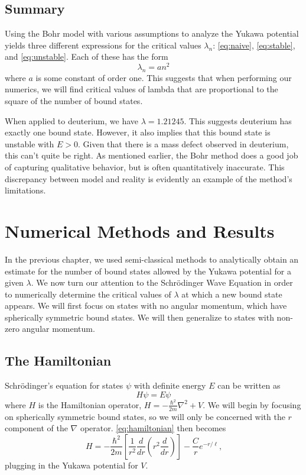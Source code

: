 \documentclass[12pt,twoside]{reedthesis}
\newcommand{\eqn}[1]{\begin{equation}#1\end{equation}}
\begin{document}
\section{Summary}
Using the Bohr model with various assumptions to analyze the Yukawa potential yields three different expressions for the critical values $\lambda_n$: \eqref{eq:naive}, \eqref{eq:stable}, and \eqref{eq:unstable}. Each of these has the form 
\eqn{
\lambda_{n} = a n^2
}
where $a$ is some constant of order one. This suggests that when performing our numerics, we will find critical values of lambda that are proportional to the square of the number of bound states. 

When applied to deuterium, we have $\lambda = 1.21245$. This suggests deuterium has exactly one bound state. However, it also implies that this bound state is unstable with $E > 0$. Given that there is a mass defect observed in deuterium, this can't quite be right. As mentioned earlier, the Bohr method does a good job of capturing qualitative behavior, but is often quantitatively inaccurate. This discrepancy between model and reality is evidently an example of the method's limitations.

\clearpage %

\chapter{Numerical Methods and Results}

In the previous chapter, we used semi-classical methods to analytically obtain an estimate for the number of bound states allowed by the Yukawa potential for a given $\lambda$.  We now turn our attention to the Schr\"odinger Wave Equation in order to numerically determine the critical values of $\lambda$ at which a new bound state appears. We will first focus on states with no angular momentum, which have spherically symmetric bound states. We will then generalize to states with non-zero angular momentum.

\section{The Hamiltonian}

Schr\"odinger's equation for states $\psi$ with definite energy $E$ can be written as
\eqn{
H \psi = E\psi
\label{eq:hamiltonian}
}
where $H$ is the Hamiltonian operator, $H =-\frac{\hbar^2}{2m}\nabla^2 +V$.  We will begin by focusing on spherically symmetric bound states, so we will only be concerned with the $r$ component of the $\nabla$ operator. \eqref{eq:hamiltonian} then becomes
\eqn{
H = -\frac{\hbar^2}{2m} \left[\frac{1}{r^2}\frac{d}{dr}\left(r^2 \frac{d}{dr}\right)\right] - \frac{C}{r}e^{-r/\ell}\mbox{,}
}
plugging in the Yukawa potential for $V$.
\end{document}

